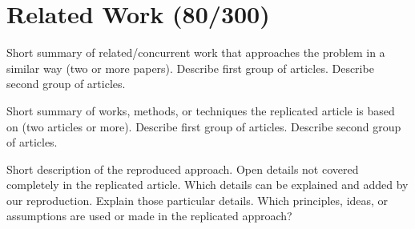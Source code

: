 \section{Related Work (80/300)}

Short summary of related/concurrent work that approaches the problem in a similar way (two or more papers).
Describe first group of articles.
Describe second group of articles.

Short summary of works, methods, or techniques the replicated article is based on (two articles or more).
Describe first group of articles.
Describe second group of articles.

Short description of the reproduced approach.
Open details not covered completely in the replicated article.
Which details can be explained and added by our reproduction.
Explain those particular details.
Which principles, ideas, or assumptions are used or made in the replicated approach?
